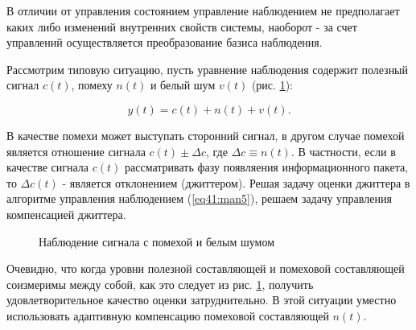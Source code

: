 В отличии от управления состоянием управление наблюдением не предполагает каких либо изменений внутренних свойств системы, наоборот - за счет управлений осуществляется преобразование базиса наблюдения.

Рассмотрим типовую ситуацию, пусть уравнение наблюдения содержит полезный сигнал $c(t)$, помеху $n(t)$ и белый шум $v(t)$ (рис. \ref{fig:man_1}):

\begin{equation}\label{eq41:man7}
y(t)=c(t)+n(t)+v(t).
\end{equation}

В качестве помехи может выступать сторонний сигнал, в другом случае помехой является отношение сигнала $c(t)\pm \Delta c$, где $\Delta c\equiv n(t)$. 
В частности, если в качестве сигнала $c(t)$ рассматривать фазу появляения информационного пакета, то $\Delta c(t)$ - является отклонением (джиттером).
Решая задачу оценки джиттера в алгоритме управления наблюдением (\ref{eq41:man5}), решаем задачу управления компенсацией джиттера.

\begin{figure}[!h]

\centering
{} 
\caption{Наблюдение сигнала с помехой и белым шумом}
\label{fig:man_1}
\end{figure}


Очевидно, что когда уровни полезной составляющей и помеховой составляющей соизмеримы между собой, как это следует из рис. \ref{fig:man_1}, получить удовлетворительное качество оценки затруднительно. 
В этой ситуации уместно использовать адаптивную компенсацию помеховой составляющей $n(t)$.

